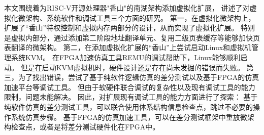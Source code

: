 \begin{conclusions}

本文围绕着为RISC-V开源处理器"香山"的南湖架构添加虚拟化扩展，
讲述了对虚拟化微架构、系统软件和调试工具三个方面的研究。
第一，在虚拟化微架构上，扩展了“香山”特权控制和虚拟内存两部分的设计，从而实现了虚拟化扩展。
特别是虚拟内部分，通过添加第二阶段地址翻译单元、复用二级页表缓存等能够加快页表翻译的微架构。
第二，在添加虚拟化扩展的“香山”上尝试启动Linux和虚拟机管理系统KVM。
在FPGA加速仿真工具REMU的调试帮助下，Linux能够顺利启动。
但是在启动KVM虚拟机时，硬件设计还是存在尚未发掘的错误而失败。
第三，为了找出错误，尝试了基于纯软件逻辑仿真的差分测试以及基于FPGA的仿真加速平台等调试工具。
但由于软硬件联合调试的复杂性以及现有调试工具的能力限制，问题未能解决。
因此，对扩展现有调试工具的能力方面进行了探索：
基于纯软件仿真的差分测试工具，可以联合使用体系结构信息检查点，跳过不必要的操作系统仿真步骤。
基于FPGA的仿真加速工具，可以在差分测试框架中重放微架构检查点，或者是将差分测试硬件化在FPGA中。

\end{conclusions}
